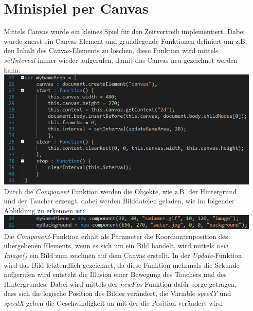 \chapter{Minispiel per Canvas}
Mittels Canvas wurde ein kleines Spiel f\"ur den Zeitvertreib implementiert. Dabei wurde zuerst ein Canvas-Element und grundlegende Funktionen definiert um z.B. den Inhalt des Canvas-Elements zu löschen, diese Funktion wird mittels \textit{setInterval} immer wieder aufgerufen, damit das Canvas neu gezeichnet werden kann.     
\newline
\includegraphics[width=1\textwidth]{img/vincent/abb04.png}
\newline
Durch die \textit{Component} Funktion werden die Objekte, wie z.B. der Hintergrund und der Taucher erzeugt, dabei werden Bilddateien geladen, wie im folgender Abbildung zu erkennen ist: 
\newline
\includegraphics[width=1\textwidth]{img/vincent/abb05.png}
\newline
Die \textit{Component}-Funktion erh\"alt als Parameter die Koordinatenposition des \"ubergebenen Elements, wenn es sich um ein Bild handelt, wird mittels \textit{new Image()} ein Bild zum zeichnen auf dem Canvas erstellt. In der \textit{Update}-Funktion wird das Bild letztendlich gezeichnet, da diese Funktion mehrmals die Sekunde aufgerufen wird entsteht die Illusion einer Bewegung des Tauchers und des Hintergrundes. Dabei wird mittels der \textit{newPos}-Funktion daf\"ur sorge getragen, dass sich die logische Position des Bildes ver\"andert, die Variable \textit{speedY} und \textit{speedX} geben die Geschwindigkeit an mit der die Position ver\"andert wird. 
\newline
